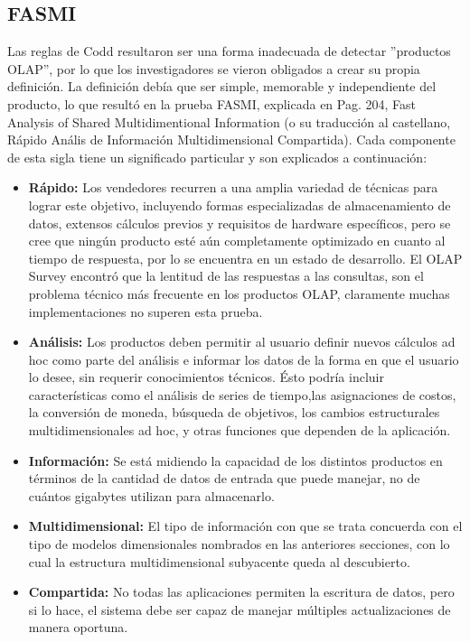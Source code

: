 \documentclass[a4paper,11pt]{article}
\begin{document}
\begin{flushleft}
    
    \subsection{FASMI}
    
    Las reglas de Codd resultaron ser una forma inadecuada de detectar ”productos OLAP”, por lo que los investigadores se vieron obligados a crear su propia
    definición. La definición debía que ser simple, memorable y independiente del producto, lo que resultó en la prueba FASMI, explicada en
    \cite{nagabhushana} Pag. 204, Fast Analysis of Shared Multidimentional Information (o su traducción al castellano, Rápido Anális de Información 
    Multidimensional Compartida). Cada componente de esta sigla tiene un significado particular y son explicados a continuación:
    
    \begin{itemize}
      \item \textbf{Rápido:} Los vendedores recurren a una amplia variedad de técnicas para lograr este objetivo, incluyendo formas especializadas de
      almacenamiento de datos, extensos cálculos previos y requisitos de hardware específicos, pero se cree que ningún producto esté aún completamente
      optimizado en cuanto al tiempo de respuesta, por lo se encuentra en un estado de desarrollo. El OLAP Survey encontró que la lentitud de las respuestas
      a las consultas, son el problema técnico más frecuente en los productos OLAP, claramente muchas implementaciones no superen esta prueba.
      \item \textbf{Análisis:} Los productos deben permitir al usuario definir nuevos cálculos ad hoc como parte del análisis e informar los datos de la
      forma en que el usuario lo desee, sin requerir conocimientos técnicos. Ésto podría incluir características como el análisis de series de tiempo,las
      asignaciones de costos, la conversión de moneda, búsqueda de objetivos, los cambios estructurales multidimensionales ad hoc, y otras funciones que
      dependen de la aplicación.
      \item \textbf{Información:} Se está midiendo la capacidad de los distintos productos en términos de la cantidad de datos de entrada que puede manejar,
      no de cuántos gigabytes utilizan para almacenarlo.
      \item \textbf{Multidimensional:} El tipo de información con que se trata concuerda con el tipo de modelos dimensionales nombrados en las anteriores
      secciones, con lo cual la estructura multidimensional subyacente queda al descubierto.
      \item \textbf{Compartida:} No todas las aplicaciones permiten la escritura de datos, pero si lo hace, el sistema debe ser capaz de manejar múltiples
      actualizaciones de manera oportuna.
    \end{itemize}
     

\end{flushleft}
\end{document}

